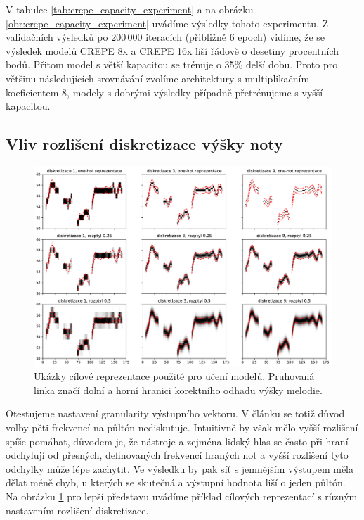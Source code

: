 V tabulce \ref{tab:crepe_capacity_experiment} a na obrázku \ref{obr:crepe_capacity_experiment} uvádíme výsledky tohoto experimentu. Z validačních výsledků po $200\,000$ iteracích (přibližně 6 epoch) vidíme, že se výsledek modelů CREPE 8x a CREPE 16x liší řádově o desetiny procentních bodů. Přitom model s větší kapacitou se trénuje o 35\% delší dobu. Proto pro většinu následujících srovnávání zvolíme architektury s multiplikačním koeficientem 8, modely s dobrými výsledky případně přetrénujeme s vyšší kapacitou.

\subsection{Vliv rozlišení diskretizace výšky noty}\label{sec:crepe_diskretizace}

\begin{figure}[h]\centering
    \includegraphics[width=\textwidth,height=\textheight,keepaspectratio]{../img/reprezentace_vstupu.pdf}
\caption{Ukázky cílové reprezentace použité pro učení modelů. Pruhovaná linka značí dolní a horní hranici korektního odhadu výšky melodie.}\label{obr:reprezentace_vstupu}
\end{figure}

Otestujeme nastavení granularity výstupního vektoru. V článku \cite{Kim2018} se totiž důvod volby pěti frekvencí na půltón nediskutuje. Intuitivně by však mělo vyšší rozlišení spíše pomáhat, důvodem je, že nástroje a zejména lidský hlas se často při hraní odchylují od přesných, definovaných frekvencí hraných not a vyšší rozlišení tyto odchylky může lépe zachytit. Ve výsledku by pak síť s jemnějším výstupem měla dělat méně chyb, u kterých se skutečná a výstupní hodnota liší o jeden půltón. Na obrázku \ref{obr:reprezentace_vstupu} pro lepší představu uvádíme příklad cílových reprezentací s různým nastavením rozlišení diskretizace.

